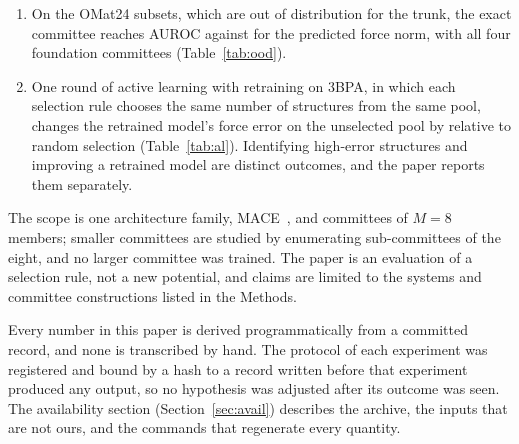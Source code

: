 \begin{enumerate}
\item On the OMat24 subsets, which are out of distribution for the trunk, the
exact committee reaches AUROC 
against  for the predicted
force norm, with all four foundation committees (Table~\ref{tab:ood}).
\item One round of active learning with retraining on 3BPA, in which each
selection rule chooses the same number of structures from the same pool,
changes the retrained model's force error on the unselected pool by
relative to random selection (Table~\ref{tab:al}). Identifying high-error
structures and improving a retrained model are distinct outcomes, and the paper
reports them separately.
\end{enumerate}
The scope is one architecture family, MACE~\citep{batatia2022mace}, and
committees of $M=8$ members; smaller committees are studied by enumerating
sub-committees of the eight, and no larger committee was trained. The paper is
an evaluation of a selection rule, not a new potential, and claims are limited
to the systems and committee constructions listed in the Methods.

Every number in this paper is derived programmatically from a committed record,
and none is transcribed by hand. The protocol of each experiment was registered
and bound by a hash to a record written before that experiment produced any
output, so no hypothesis was adjusted after its outcome was seen. The
availability section (Section~\ref{sec:avail}) describes the archive, the
inputs that are not ours, and the commands that regenerate every quantity.
